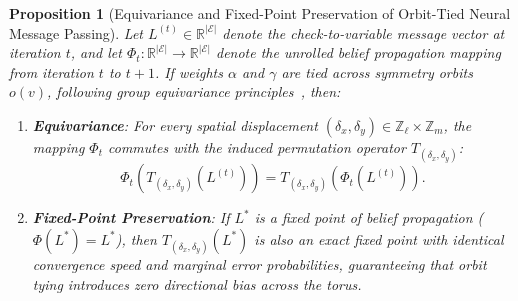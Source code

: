 \documentclass[journal]{IEEEtran}
\newtheorem{proposition}{Proposition}
\begin{document}
\begin{proposition}[Equivariance and Fixed-Point Preservation of Orbit-Tied Neural Message Passing]
\label{prop:equivariance}
Let $L^{(t)} \in \mathbb{R}^{|\mathcal{E}|}$ denote the check-to-variable message vector at iteration $t$, and let $\Phi_t: \mathbb{R}^{|\mathcal{E}|} \to \mathbb{R}^{|\mathcal{E}|}$ denote the unrolled belief propagation mapping from iteration $t$ to $t+1$. If weights $\alpha$ and $\gamma$ are tied across symmetry orbits $o(v)$, following group equivariance principles~\cite{wang2022approximately}, then:
\begin{enumerate}
    \item \textbf{Equivariance}: For every spatial displacement $(\delta_x, \delta_y) \in \mathbb{Z}_\ell \times \mathbb{Z}_m$, the mapping $\Phi_t$ commutes with the induced permutation operator $T_{(\delta_x, \delta_y)}$:
    \begin{equation}
        \Phi_t(T_{(\delta_x, \delta_y)}(L^{(t)})) = T_{(\delta_x, \delta_y)}(\Phi_t(L^{(t)})).
    \end{equation}
    \item \textbf{Fixed-Point Preservation}: If $L^*$ is a fixed point of belief propagation ($\Phi(L^*) = L^*$), then $T_{(\delta_x, \delta_y)}(L^*)$ is also an exact fixed point with identical convergence speed and marginal error probabilities, guaranteeing that orbit tying introduces zero directional bias across the torus.
\end{enumerate}
\end{proposition}
\end{document}
